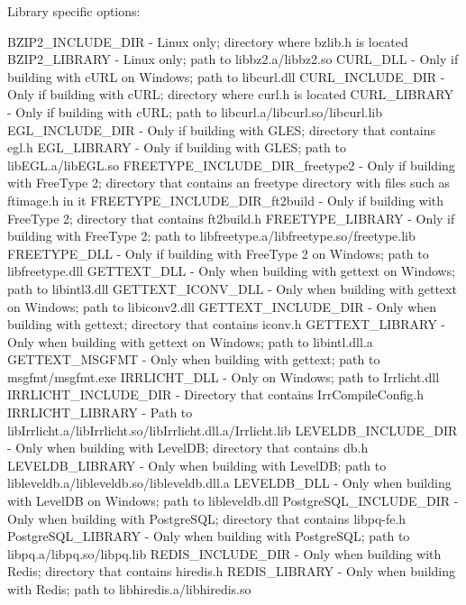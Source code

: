 Library specific options\+: \begin{DoxyVerb}BZIP2_INCLUDE_DIR               - Linux only; directory where bzlib.h is located
BZIP2_LIBRARY                   - Linux only; path to libbz2.a/libbz2.so
CURL_DLL                        - Only if building with cURL on Windows; path to libcurl.dll
CURL_INCLUDE_DIR                - Only if building with cURL; directory where curl.h is located
CURL_LIBRARY                    - Only if building with cURL; path to libcurl.a/libcurl.so/libcurl.lib
EGL_INCLUDE_DIR                 - Only if building with GLES; directory that contains egl.h
EGL_LIBRARY                     - Only if building with GLES; path to libEGL.a/libEGL.so
FREETYPE_INCLUDE_DIR_freetype2  - Only if building with FreeType 2; directory that contains an freetype directory with files such as ftimage.h in it
FREETYPE_INCLUDE_DIR_ft2build   - Only if building with FreeType 2; directory that contains ft2build.h
FREETYPE_LIBRARY                - Only if building with FreeType 2; path to libfreetype.a/libfreetype.so/freetype.lib
FREETYPE_DLL                    - Only if building with FreeType 2 on Windows; path to libfreetype.dll
GETTEXT_DLL                     - Only when building with gettext on Windows; path to libintl3.dll
GETTEXT_ICONV_DLL               - Only when building with gettext on Windows; path to libiconv2.dll
GETTEXT_INCLUDE_DIR             - Only when building with gettext; directory that contains iconv.h
GETTEXT_LIBRARY                 - Only when building with gettext on Windows; path to libintl.dll.a
GETTEXT_MSGFMT                  - Only when building with gettext; path to msgfmt/msgfmt.exe
IRRLICHT_DLL                    - Only on Windows; path to Irrlicht.dll
IRRLICHT_INCLUDE_DIR            - Directory that contains IrrCompileConfig.h
IRRLICHT_LIBRARY                - Path to libIrrlicht.a/libIrrlicht.so/libIrrlicht.dll.a/Irrlicht.lib
LEVELDB_INCLUDE_DIR             - Only when building with LevelDB; directory that contains db.h
LEVELDB_LIBRARY                 - Only when building with LevelDB; path to libleveldb.a/libleveldb.so/libleveldb.dll.a
LEVELDB_DLL                     - Only when building with LevelDB on Windows; path to libleveldb.dll
PostgreSQL_INCLUDE_DIR          - Only when building with PostgreSQL; directory that contains libpq-fe.h
PostgreSQL_LIBRARY              - Only when building with PostgreSQL; path to libpq.a/libpq.so/libpq.lib
REDIS_INCLUDE_DIR               - Only when building with Redis; directory that contains hiredis.h
REDIS_LIBRARY                   - Only when building with Redis; path to libhiredis.a/libhiredis.so

\end{DoxyVerb}
